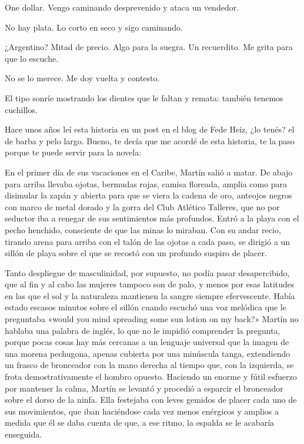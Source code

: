 \documentclass[12pt,twoside,openright,a5paper]{book}
\begin{document}
One dollar. Vengo caminando desprevenido y ataca un vendedor.

No hay plata. Lo corto en seco y sigo caminando.

¿Argentino? Mitad de precio. Algo para la suegra. Un recuerdito. Me grita
para que lo escuche.

No se lo merece. Me doy vuelta y contesto.

El tipo sonríe mostrando los dientes que le faltan y remata: también
tenemos cuchillos.


\vspace{0.5cm}
\hrulefill\hspace{0.2cm} \decofourleft\decofourright \hspace{0.2cm} \hrulefill
\vspace{0.5cm}

Hace unos años leí esta historia en un post en el blog de Fede Heiz,
¿lo tenés? el de barba y pelo largo. Bueno, te decía que me acordé de
esta historia, te la paso porque te puede servir para la novela:

En el primer día de sus vacaciones en el Caribe, Martín salió a matar. De
abajo para arriba llevaba ojotas, bermudas rojas, camisa floreada, amplia
como para disimular la zapán y abierta para que se viera la cadena de oro,
anteojos negros con marco de metal dorado y la gorra del Club Atlético
Talleres, que no por seductor iba a renegar de sus sentimientos más
profundos. Entró a la playa con el pecho henchido, consciente de que las
minas lo miraban. Con su andar recio, tirando arena para arriba con el
talón de las ojotas a cada paso, se dirigió a un sillón de playa sobre
el que se recostó con un profundo suspiro de placer.

Tanto despliegue de masculinidad, por supuesto, no podía pasar desapercibido,
que al fin y al cabo las mujeres tampoco son de palo, y menos por esas
latitudes en las que el sol y la naturaleza mantienen la sangre siempre
efervescente. Había estado escasos minutos sobre el sillón cuando escuchó
una voz melódica que le preguntaba «would you mind spreading some sun
lotion on my back?» Martín no hablaba una palabra de inglés, lo que no
le impidió comprender la pregunta, porque pocas cosas hay más cercanas a
un lenguaje universal que la imagen de una morena pechugona, apenas cubierta
por una minúscula tanga, extendiendo un frasco de bronceador con la mano
derecha al tiempo que, con la izquierda, se frota demostrativamente el
hombro opuesto. Haciendo un enorme y fútil esfuerzo por mantener la calma,
Martín se levantó y procedió a esparcir el bronceador sobre el dorso de la
ninfa. Ella festejaba con leves gemidos de placer cada uno de sus movimientos,
que iban haciéndose cada vez menos enérgicos y amplios a medida que él
se daba cuenta de que, a ese ritmo, la espalda se le acabaría enseguida.
\end{document}
